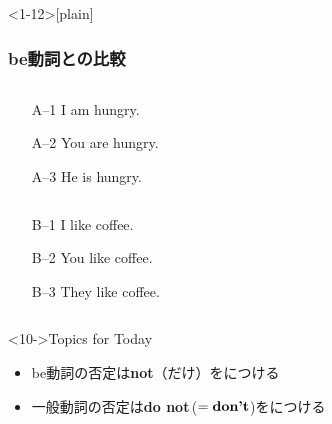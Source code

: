 \documentclass[aspectratio=169,xcolor={dvipsnames,table}]{beamer}
\begin{document}
\begin{frame}<1-12>[plain]\frametitle{be動詞との比較}
\begin{columns}[T]
 \begin{column}{.48\textwidth}
\begin{itemize}
 \item[A--1] I am  hungry.
 \item[A--2] You are  hungry.
 \item[A--3] He is   hungry.
\end{itemize}
 \end{column}
\begin{column}{.48\textwidth}
\end{column}
\end{columns}

\bigskip

\bigskip

\begin{columns}[T]
 \begin{column}{.48\textwidth}
\begin{itemize}
 \item[B--1] I  like coffee.
 \item[B--2] You  like coffee.
 \item[B--3] They  like coffee.
\end{itemize}
 \end{column}
\begin{column}{.48\textwidth}
\mbox{}

\vspace*{15pt}
\end{column}
\end{columns}

\begin{block}<10->{Topics for Today}
\begin{itemize}[square]
 \item<11->  be動詞の否定は\textbf{not}（だけ）をにつける
 \item<12-> 一般動詞の否定は\textbf{do not}\,($=\text{\textbf{don't}}$)をにつける%
\hfill{}\hspace{5pt}
\end{itemize}
      \end{block}
\end{frame}
\end{document}
